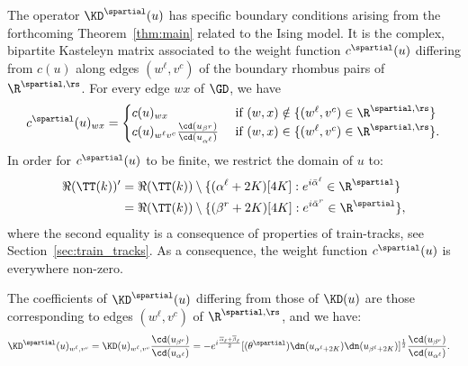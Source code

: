 \documentclass[a4paper,twoside,11pt]{article}
\begin{document}
The operator $\KD^\spartial(u)$ has specific boundary conditions arising from the forthcoming Theorem~\ref{thm:main} related 
to the Ising model. 
It is the complex, bipartite Kasteleyn matrix 
associated to the weight function $c^\spartial(u)$ differing from $c(u)$ along 
edges $(w^\ell, v^c)$ of the boundary rhombus pairs of $\R^{\spartial,\rs}$. For every edge $wx$ of $\GD$, we have
\begin{equation}\label{equ:def_c_partial}
c^\spartial(u)_{wx}=
\begin{cases}
c(u)_{wx}&\text{ if $(w,x)\notin\{(w^\ell,v^c)\in\R^{\spartial,\rs}\}$}\\
c(u)_{w^\ell v^c}\frac{\cd(u_{\beta^r})}{\cd(u_{\alpha^\ell})}& \text{ if $(w,x)\in\{(w^\ell,v^c)\in\R^{\spartial,\rs}\}$}.
\end{cases}
\end{equation}
In order for $c^\spartial(u)$ to be finite, we restrict the domain of $u$ to:
\begin{align}
\Re(\TT(k))'&=\Re(\TT(k))\setminus\{(\alpha^\ell+2K)[4K]:e^{i\bar{\alpha}^\ell}\in \R^{\spartial}\}\label{equ:Re_Tk'}\\
&=\Re(\TT(k))\setminus\{(\beta^r+2K)[4K]:e^{i\bar{\alpha}^r}\in \R^{\spartial}\},\nonumber
\end{align}
where the second equality is a consequence of properties of train-tracks, see Section~\ref{sec:train_tracks}.
As a consequence, the weight function $c^{\spartial}(u)$ is everywhere non-zero. 

The coefficients of $\KD^\spartial(u)$ differing from those of $\KD(u)$ are those corresponding to
edges $(w^\ell, v^c)$ of $\R^{\spartial,\rs}$, and we have:
\begin{align}\label{equ:defKpartial}
\KD^\spartial(u)_{w^\ell,v^c}&=\KD(u)_{w^\ell,v^c}\frac{\cd(u_{\beta^r})}{\cd(u_{\alpha^\ell})}=
-e^{i\frac{\overline{\alpha}_\ell+\overline{\beta}_\ell}{2}}[\sc(\theta^\spartial)\dn(u_{\alpha^\ell+2K})\dn(u_{\beta^\ell+2K})]^{\frac{1}{2}}
\frac{\cd(u_{\beta^r})}{\cd(u_{\alpha^\ell})}.
\end{align}
\end{document}
